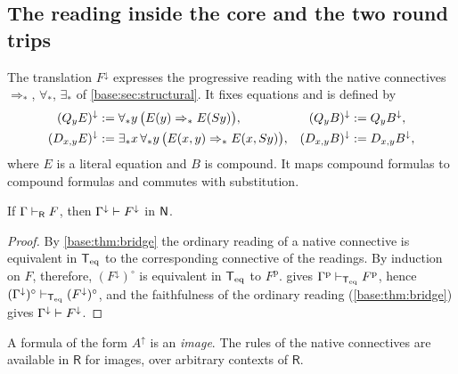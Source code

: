 \subsection{The reading inside the core and the two round trips}
\label{kern:sec:Rdown}

The translation $F^{\downarrow}$ expresses the progressive reading with the
native connectives $\Rightarrow_*$, $\forall_*$, $\exists_*$ of
\cref{base:sec:structural}.  It fixes equations and is defined by
\begin{align*}
 (Q_{y}E)^{\downarrow} &\mathrel{:=}
   \forall_* y\,\bigl(E(y)\Rightarrow_* E(S y)\bigr),
 & (Q_{y}B)^{\downarrow} &\mathrel{:=} Q_{y}B^{\downarrow},\\
 (D_{x,y}E)^{\downarrow} &\mathrel{:=}
   \exists_* x\,\forall_* y\,\bigl(E(x,y)\Rightarrow_* E(x,S y)\bigr),
 & (D_{x,y}B)^{\downarrow} &\mathrel{:=} D_{x,y}B^{\downarrow},
\end{align*}
where $E$ is a literal equation and $B$ is compound.  It maps compound
formulas to compound formulas and commutes with substitution.

\begin{theorem}
\label{kern:thm:rdown}
If $\Gamma\vdash_{\mathsf{R}}F$, then
$\Gamma^{\downarrow}\vdash F^{\downarrow}$ in $\mathsf{N}$.
\end{theorem}

\begin{proof}
By \cref{base:thm:bridge} the ordinary reading of a native connective is
equivalent in $\mathsf{T}_{\mathrm{eq}}$ to the corresponding connective of the readings.  By
induction on $F$, therefore, $(F^{\downarrow})^{\circ}$ is equivalent in
$\mathsf{T}_{\mathrm{eq}}$ to $F^{\mathrm{p}}$.   gives
$\Gamma^{\mathrm{p}}\vdash_{\mathsf{T}_{\mathrm{eq}}}F^{\mathrm{p}}$, hence
$(\Gamma^{\downarrow})^{\circ}\vdash_{\mathsf{T}_{\mathrm{eq}}}(F^{\downarrow})^{\circ}$, and
the faithfulness of the ordinary reading (\cref{base:thm:bridge}) gives
$\Gamma^{\downarrow}\vdash F^{\downarrow}$.
\end{proof}

A formula of the form $A^{\uparrow}$ is an \emph{image}.  The rules of the
native connectives are available in $\mathsf{R}$ for images, over arbitrary
contexts of $\mathsf{R}$.


